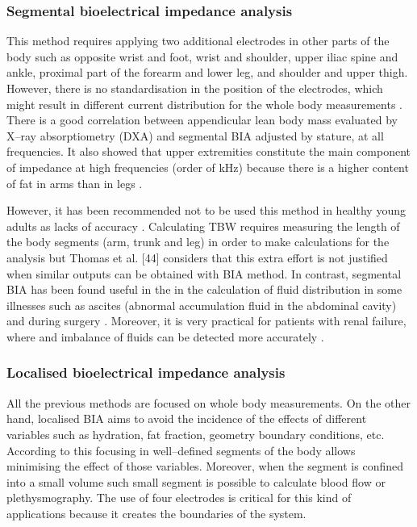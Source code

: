 \subsubsection{Segmental bioelectrical impedance analysis}
This method requires applying two additional electrodes in other parts of the body such as opposite wrist and foot, wrist and shoulder, upper iliac spine and ankle, proximal part of the forearm and lower leg, and shoulder and upper thigh. However, there is no standardisation in the position of the electrodes, which might result in different current distribution for the whole body measurements \cite{kyle2004bioelectrical, woodrow1996segmental}. There is a good correlation between appendicular lean body mass evaluated by X–ray absorptiometry (DXA) and segmental BIA adjusted by stature, at all frequencies. It also showed that upper extremities constitute the main component of impedance at high frequencies (order of \si{\kHz}) because there is a higher content of fat in arms than in legs \cite{delorenzo2003segmental}. 

However, it has been recommended not to be used this method in healthy young adults as lacks of accuracy \cite{laforgia2008body,leahy2012comparison}. Calculating TBW requires measuring the length of the body segments (arm, trunk and leg) in order to make calculations for the analysis but Thomas et al. [44] considers that this extra effort is not justified when similar outputs can be obtained with BIA method. In contrast, segmental BIA has been found useful in the in the calculation of fluid distribution in some illnesses such as ascites (abnormal accumulation fluid in the abdominal cavity) and during surgery \cite{kyle2004bioelectrical}. Moreover, it is very practical for patients with renal failure, where and imbalance of fluids can be detected more accurately \cite{woodrow1996segmental,thomas2003comparison}. 

\subsubsection{Localised bioelectrical impedance analysis}
All the previous methods are focused on whole body measurements. On the other hand, localised BIA aims to avoid the incidence of the effects of different variables such as hydration, fat fraction, geometry boundary conditions, etc. According to this focusing in well–defined segments of the body allows minimising the effect of those variables. Moreover, when the segment is confined into a small volume such small segment is possible to calculate blood flow or plethysmography. The use of four electrodes is critical for this kind of applications because it creates the boundaries of the system. 

